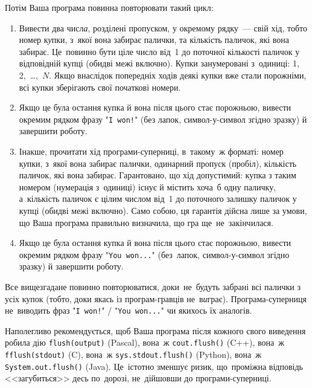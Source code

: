 Потім Ваша програма повинна повторювати такий цикл:
\begin{enumerate}
\item
Вивести два числ{\it а}, розділені пропуском, у окремому рядку~--- свій хід, тобто номер к{\it у}пки, з~якої вона забирає палички, та кількість паличок, які вона забирає.
Це~повинно бути ціле число від~1 до поточної кількості паличок у відповідній купці (обидві межі включно).
Купки занумеровані з~одиниці: 1, 2,~\dots,~$N$. Якщо внаслідок попередніх ходів деякі купки вже стали порожніми, всі купки зберігають свої початкові номери.
\item
Якщо це була остання купка й вона після цього стає порожньою, 
вивести окремим рядком фразу "\texttt{I~won!}"
(без лапок, символ-у-символ згідно зразку) й завершити роботу.
\item
Інакше, прочитати хід програми-суперниці, в~такому~ж форматі: номер к{\it у}пки, з~якої вона забирає палички, одинарний пропуск (пробіл), кількість паличок, які вона забирає.
Гарантовано, що хід допустимий: купка з таким номером (нумерація з~одиниці) існує й містить хоча~б одну паличку, а~кількість паличок є цілим числом від~1 до поточного залишку паличок у купці (обидві межі включно).
Само собою, ця гарантія дійсна лише за умови, що Ваша програма правильно визначила, що гра ще~не~закінчилася.
\item
Якщо це була остання купка й вона після цього стає порожньою, 
вивести окремим рядком фразу "\texttt{You~won...}"
(без~лапок, символ-у-символ згідно зразку) й завершити роботу.
\end{enumerate}
Все вищезгадане повинно повторюватися, доки~не~будуть забрані всі палички з усіх купок (тобто, доки якась із програм-гравців не~в{\it и}грає).
Програма-суперниця не~виводить фраз "\texttt{I~won!}" / "\texttt{You~won...}"
чи якихось їх аналогів.

Наполегливо рекомендується, щоб Ваша програма після кожного свого виведення 
робила дію \verb"flush(output)" (Pascal), 
вона~ж \verb"cout.flush()" (C++), 
вона~ж \verb"fflush(stdout)" (C), 
вона~ж \verb"sys.stdout.flush()" (Python),
вона~ж \verb"System.out.flush()" (Java).
Це~істотно зменшує ризик, 
що~проміжна відповідь <<загубиться>> десь по~дорозі, 
не~дійшовши до програми-суперниці.

\Example

\begin{example}
\end{example}


